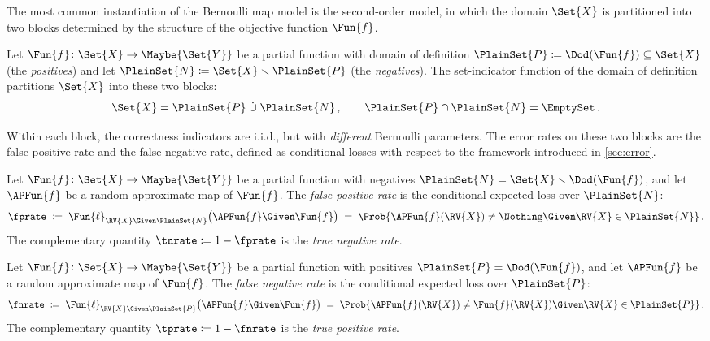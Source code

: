 \documentclass[ ../main.tex]{subfiles}
\begin{document}
The most common instantiation of the Bernoulli map model is the second-order
model, in which the domain $\Set{X}$ is partitioned into two blocks determined
by the structure of the objective function $\Fun{f}$.

Let $\Fun{f} \colon \Set{X} \to \Maybe{\Set{Y}}$ be a partial function with
domain of definition $\PlainSet{P} \coloneqq \Dod(\Fun{f}) \subseteq \Set{X}$
(the \emph{positives}) and let $\PlainSet{N} \coloneqq \Set{X} \smallsetminus
\PlainSet{P}$ (the \emph{negatives}).
The set-indicator function of the domain of definition partitions $\Set{X}$
into these two blocks:
\begin{equation}
\label{eq:partition}
    \Set{X} = \PlainSet{P} \;\dot{\cup}\; \PlainSet{N}\,,
    \qquad
    \PlainSet{P} \cap \PlainSet{N} = \EmptySet\,.
\end{equation}

Within each block, the correctness indicators are i.i.d., but with
\emph{different} Bernoulli parameters.
The error rates on these two blocks are the false positive rate and the false
negative rate, defined as conditional losses with respect to the framework
introduced in \cref{sec:error}.

\begin{definition}
\label{def:fpr}
Let $\Fun{f} \colon \Set{X} \to \Maybe{\Set{Y}}$ be a partial function with
negatives $\PlainSet{N} = \Set{X} \smallsetminus \Dod(\Fun{f})$, and let
$\APFun{f}$ be a random approximate map of $\Fun{f}$.
The \emph{false positive rate} is the conditional expected loss over
$\PlainSet{N}$:
\begin{equation}
\label{eq:fpr_def}
    \fprate
    \;\coloneqq\;
    \Fun{\ell}_{\RV{X} \Given \PlainSet{N}}\!\left(\APFun{f} \Given \Fun{f}\right)
    \;=\;
    \Prob{\APFun{f}(\RV{X}) \neq \Nothing \Given \RV{X} \in \PlainSet{N}}\,.
\end{equation}
The complementary quantity $\tnrate \coloneqq 1 - \fprate$ is the \emph{true
negative rate}.
\end{definition}

\begin{definition}
\label{def:fnr}
Let $\Fun{f} \colon \Set{X} \to \Maybe{\Set{Y}}$ be a partial function with
positives $\PlainSet{P} = \Dod(\Fun{f})$, and let $\APFun{f}$ be a random
approximate map of $\Fun{f}$.
The \emph{false negative rate} is the conditional expected loss over
$\PlainSet{P}$:
\begin{equation}
\label{eq:fnr_def}
    \fnrate
    \;\coloneqq\;
    \Fun{\ell}_{\RV{X} \Given \PlainSet{P}}\!\left(\APFun{f} \Given \Fun{f}\right)
    \;=\;
    \Prob{\APFun{f}(\RV{X}) \neq \Fun{f}(\RV{X}) \Given \RV{X} \in \PlainSet{P}}\,.
\end{equation}
The complementary quantity $\tprate \coloneqq 1 - \fnrate$ is the \emph{true
positive rate}.
\end{definition}
\end{document}
